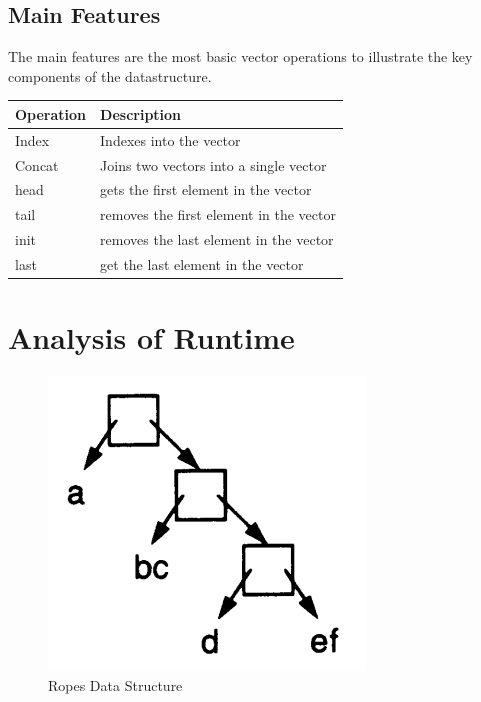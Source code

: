 \documentclass[11pt,a4paper,oneside]{article}
\begin{document}
\subsection{Main Features}

The main features are the most basic vector operations to illustrate the key components of the datastructure. 

\begin{center}

\begin{tabular}{| l | l |}
\hline
Operation & Description\\
\hline
Index & Indexes into the vector\\
Concat & Joins two vectors into a single vector\\
head   & gets the first element in the vector\\
tail   & removes the first element in the vector\\
init  & removes the last element in the vector\\
last   & get the last element in the vector\\
\hline
\end{tabular}

\end{center}

\section{Analysis of Runtime}

\begin{figure}
	\centering
	\includegraphics[scale=0.5]{img/ropes.png}
	\caption{Ropes Data Structure}
\end{figure}
\end{document}
